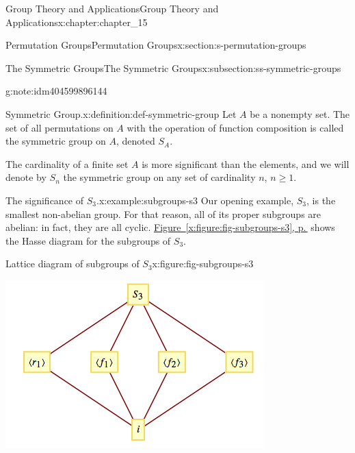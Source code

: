 \documentclass[twoside,10pt,]{book}
\newcommand{\xreffont}{\relax}
\numberwithin{equation}{section}
\begin{document}
\begin{chapterptx}{Group Theory and Applications}{}{Group Theory and Applications}{}{}{x:chapter:chapter_15}
\begin{sectionptx}{Permutation Groups}{}{Permutation Groups}{}{}{x:section:s-permutation-groups}
\begin{subsectionptx}{The Symmetric Groups}{}{The Symmetric Groups}{}{}{x:subsection:ss-symmetric-groups}
\begin{note}{}{g:note:idm404599896144}
\end{note}
\begin{definition}{Symmetric Group.}{x:definition:def-symmetric-group}%
%
\label{g:notation:idm404599890928}%
\label{g:notation:idm404599889936}%
Let \(A\) be a nonempty set. The set of all permutations on \(A\) with the operation of function composition is called the symmetric group on \(A\), denoted \(S_A\).%
\par
The cardinality of a finite set \(A\) is more significant than the elements, and we will denote by \(S_n\) the symmetric group on any set of cardinality \(n\), \(n\geq 1\).%
\end{definition}
\begin{example}{The significance of \(S_3\).}{x:example:subgroups-s3}%
Our opening example, \(S_3\), is the smallest non-abelian group. For that reason, all of its proper subgroups are abelian: in fact, they are all cyclic. \hyperref[x:figure:fig-subgroups-s3]{Figure~{\xreffont\ref{x:figure:fig-subgroups-s3}}, p.\,\pageref{x:figure:fig-subgroups-s3}} shows the Hasse diagram for the subgroups of \(S_3\).%
\begin{figureptx}{Lattice diagram of subgroups of \(S_3\)}{x:figure:fig-subgroups-s3}{}%
\begin{image}{0.15}{0.7}{0.15}%
\includegraphics[width=\linewidth]{images/fig-subgroups-s3.png}
\end{image}%
\tcblower
\end{figureptx}%
\end{example}
\end{subsectionptx}
\end{sectionptx}
\end{chapterptx}
\end{document}
